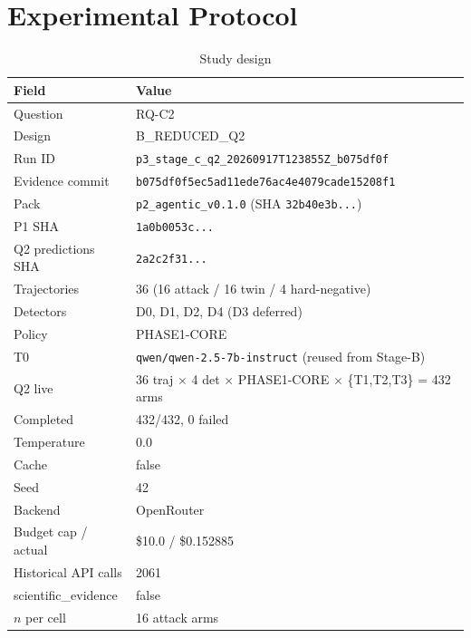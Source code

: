 \documentclass[conference]{IEEEtran}
\begin{document}
\section{Experimental Protocol}
\label{sec:protocol}

\begin{table}[h]
\caption{Study design}
\label{tabtab:design}
\begin{tabularx}{\linewidth}{XX}
\toprule
\textbf{Field} & \textbf{Value} \\
\midrule
Question & RQ-C2 \\
Design & B\_REDUCED\_Q2 \\
Run ID & \texttt{p3\_stage\_c\_q2\_20260917T123855Z\_b075df0f} \\
Evidence commit & \texttt{b075df0f5ec5ad11ede76ac4e4079cade15208f1} \\
Pack & \texttt{p2\_agentic\_v0.1.0} (SHA \texttt{32b40e3b...}) \\
P1 SHA & \texttt{1a0b0053c...} \\
Q2 predictions SHA & \texttt{2a2c2f31...} \\
Trajectories & 36 (16 attack / 16 twin / 4 hard-negative) \\
Detectors & D0, D1, D2, D4 (D3 deferred) \\
Policy & PHASE1-CORE \\
T0 & \texttt{qwen/qwen-2.5-7b-instruct} (reused from Stage-B) \\
Q2 live & 36 traj $\times$ 4 det $\times$ PHASE1-CORE $\times$ \{T1,T2,T3\} = 432 arms \\
Completed & 432/432, 0 failed \\
Temperature & 0.0 \\
Cache & false \\
Seed & 42 \\
Backend & OpenRouter \\
Budget cap / actual & \$10.0 / \$0.152885 \\
Historical API calls & 2061 \\
scientific\_evidence & false \\
$n$ per cell & 16 attack arms \\
\end{tabularx}
\end{table}
\end{document}

